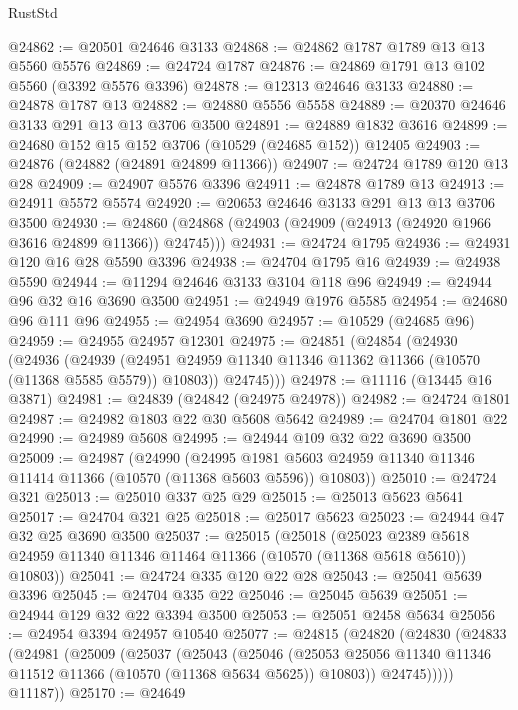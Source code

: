 \begin{lexlean}{RustStd}
\begin{coremodule}
@24862 := @20501 @24646 @3133
@24868 := @24862 @1787 @1789 @13 @13 @5560 @5576
@24869 := @24724 @1787
@24876 := @24869 @1791 @13 @102 @5560 (@3392 @5576 @3396)
@24878 := @12313 @24646 @3133
@24880 := @24878 @1787 @13
@24882 := @24880 @5556 @5558
@24889 := @20370 @24646 @3133 @291 @13 @13 @3706 @3500
@24891 := @24889 @1832 @3616
@24899 := @24680 @152 @15 @152 @3706 (@10529 (@24685 @152)) @12405
@24903 := @24876 (@24882 (@24891 @24899 @11366))
@24907 := @24724 @1789 @120 @13 @28
@24909 := @24907 @5576 @3396
@24911 := @24878 @1789 @13
@24913 := @24911 @5572 @5574
@24920 := @20653 @24646 @3133 @291 @13 @13 @3706 @3500
@24930 := @24860 (@24868 (@24903 (@24909 (@24913 (@24920 @1966 @3616 @24899 @11366)) @24745)))
@24931 := @24724 @1795
@24936 := @24931 @120 @16 @28 @5590 @3396
@24938 := @24704 @1795 @16
@24939 := @24938 @5590
@24944 := @11294 @24646 @3133 @3104 @118 @96
@24949 := @24944 @96 @32 @16 @3690 @3500
@24951 := @24949 @1976 @5585
@24954 := @24680 @96 @111 @96
@24955 := @24954 @3690
@24957 := @10529 (@24685 @96)
@24959 := @24955 @24957 @12301
@24975 := @24851
    (@24854
      (@24930
        (@24936
          (@24939 (@24951 @24959 @11340 @11346 @11362 @11366 (@10570 (@11368 @5585 @5579)) @10803))
          @24745)))
@24978 := @11116 (@13445 @16 @3871)
@24981 := @24839 (@24842 (@24975 @24978))
@24982 := @24724 @1801
@24987 := @24982 @1803 @22 @30 @5608 @5642
@24989 := @24704 @1801 @22
@24990 := @24989 @5608
@24995 := @24944 @109 @32 @22 @3690 @3500
@25009 := @24987
    (@24990
      (@24995 @1981 @5603 @24959 @11340 @11346 @11414 @11366 (@10570 (@11368 @5603 @5596)) @10803))
@25010 := @24724 @321
@25013 := @25010 @337 @25 @29
@25015 := @25013 @5623 @5641
@25017 := @24704 @321 @25
@25018 := @25017 @5623
@25023 := @24944 @47 @32 @25 @3690 @3500
@25037 := @25015
    (@25018
      (@25023 @2389 @5618 @24959 @11340 @11346 @11464 @11366 (@10570 (@11368 @5618 @5610)) @10803))
@25041 := @24724 @335 @120 @22 @28
@25043 := @25041 @5639 @3396
@25045 := @24704 @335 @22
@25046 := @25045 @5639
@25051 := @24944 @129 @32 @22 @3394 @3500
@25053 := @25051 @2458 @5634
@25056 := @24954 @3394 @24957 @10540
@25077 := @24815
    (@24820
      (@24830
        (@24833
          (@24981
            (@25009
              (@25037
                (@25043
                  (@25046
                    (@25053
                      @25056
                      @11340
                      @11346
                      @11512
                      @11366
                      (@10570 (@11368 @5634 @5625))
                      @10803))
                  @24745)))))
        @11187))
@25170 := @24649

\end{coremodule}
\end{lexlean}
